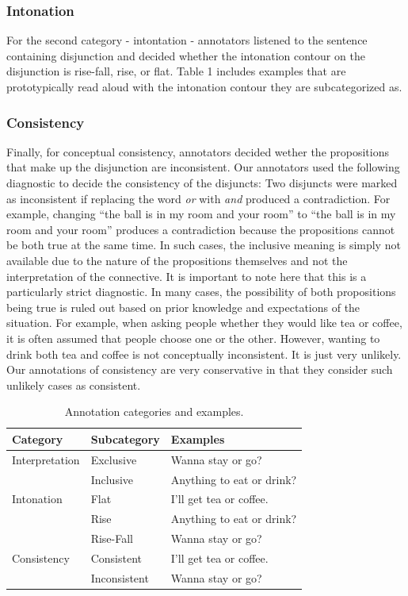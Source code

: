 \documentclass[10pt, letterpaper]{article}
\begin{document}
\subsubsection{Intonation}\label{intonation}

For the second category - intontation - annotators listened to the
sentence containing disjunction and decided whether the intonation
contour on the disjunction is rise-fall, rise, or flat. Table 1 includes
examples that are prototypically read aloud with the intonation contour
they are subcategorized as.

\subsubsection{Consistency}\label{consistency}

Finally, for conceptual consistency, annotators decided wether the
propositions that make up the disjunction are inconsistent. Our
annotators used the following diagnostic to decide the consistency of
the disjuncts: Two disjuncts were marked as inconsistent if replacing
the word \emph{or} with \emph{and} produced a contradiction. For
example, changing ``the ball is in my room and your room'' to ``the ball
is in my room and your room'' produces a contradiction because the
propositions cannot be both true at the same time. In such cases, the
inclusive meaning is simply not available due to the nature of the
propositions themselves and not the interpretation of the connective. It
is important to note here that this is a particularly strict diagnostic.
In many cases, the possibility of both propositions being true is ruled
out based on prior knowledge and expectations of the situation. For
example, when asking people whether they would like tea or coffee, it is
often assumed that people choose one or the other. However, wanting to
drink both tea and coffee is not conceptually inconsistent. It is just
very unlikely. Our annotations of consistency are very conservative in
that they consider such unlikely cases as consistent.

\begin{table}[H]
\centering
\begin{tabular}{lll}
 Category & Subcategory & Examples \\ 
  \hline
Interpretation & Exclusive & Wanna stay or go? \\ 
   & Inclusive & Anything to eat or drink? \\ 
   \hline
Intonation & Flat & I'll get tea or coffee. \\ 
   & Rise & Anything to eat or drink? \\ 
   & Rise-Fall & Wanna stay or go? \\ 
   \hline
Consistency & Consistent & I'll get tea or coffee. \\ 
   & Inconsistent & Wanna stay or go? \\ 
  \end{tabular}
\caption{Annotation categories and examples.} 
\end{table}
\end{document}
